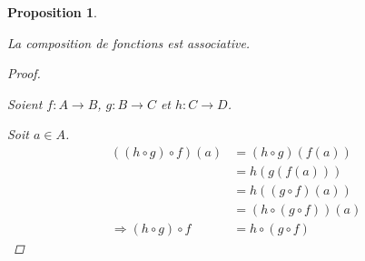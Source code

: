 \documentclass{report}
\newtheorem*{prop}{Proposition}
\theoremstyle{definition}
\theoremstyle{remark}
\begin{document}
	\begin{prop}
		~

		La composition de fonctions est associative.
		\begin{proof}~

			Soient $f:A \to B$, $g:B \to C$ et $h:C \to D$.

			Soit $a \in A$.
			\begin{align*}
				((h \circ g) \circ f)(a)&= (h \circ g)(f(a))\\
				&= h(g(f(a)))\\
				&= h((g \circ f)(a))\\
				&= (h \circ (g \circ f))(a)\\
				\Rightarrow (h \circ g) \circ f&= h \circ (g \circ f)
			\end{align*}
		\end{proof}
	\end{prop}
	\setcounter{chapter}{5}
\end{document}
